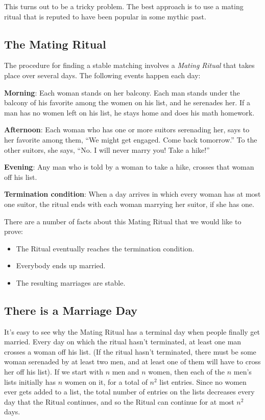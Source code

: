 This turns out to be a tricky problem.  The best approach is to use a
mating ritual that is reputed to have been popular in some mythic past.
\fi

\subsection{The Mating Ritual}

The procedure for finding a stable matching involves a \emph{Mating
Ritual} that takes place over several days.  The following events happen
each day:

\textbf{Morning}: Each woman stands on her balcony.  Each man stands
under the balcony of his favorite among the women on his list, and he
serenades her.  If a man has no women left on his list, he stays home
and does his math homework.

\textbf{Afternoon}: Each woman who has one or more suitors serenading
her, says to her favorite among them, ``We might get engaged.  Come
back tomorrow.''  To the other suitors, she says, ``No.  I will never
marry you!  Take a hike!''

\textbf{Evening}: Any man who is told by a woman to take a hike,
crosses that woman off his list.

\textbf{Termination condition}: When a day arrives in which every
woman has at most one suitor, the ritual ends with each woman marrying
her suitor, if she has one.


There are a number of facts about this Mating Ritual that we would like to
prove:

\begin{itemize}
\item The Ritual eventually reaches the termination condition.
\item Everybody ends up married.
\item The resulting marriages are stable.
\end{itemize}


\subsection{There is a Marriage Day}

It's easy to see why the Mating Ritual has a terminal day when people
finally get married.  Every day on which the ritual hasn't terminated, at
least one man crosses a woman off his list.  (If the ritual hasn't
terminated, there must be some woman serenaded by at least two men, and at
least one of them will have to cross her off his list).  If we start with
$n$ men and $n$ women, then each of the $n$ men's lists initially has $n$
women on it, for a total of $n^2$ list entries.  Since no women ever gets
added to a list, the total number of entries on the lists decreases every
day that the Ritual continues, and so the Ritual can continue for at most
$n^2$ days.

